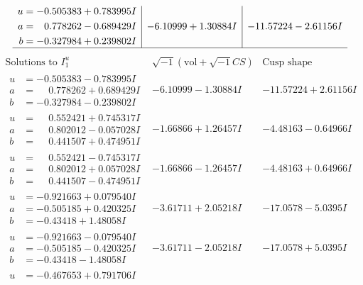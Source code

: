 \documentclass[1p]{elsarticle_modified}
\theoremstyle{definition}
\newcommand{\I}{\sqrt{-1}}
\begin{document}
$$\begin{array}{c|c|c}
\begin{aligned}
u &= -0.505383 + 0.783995 I \\
a &= \phantom{-}0.778262 - 0.689429 I \\
b &= -0.327984 + 0.239802 I\end{aligned}
 & -6.10999 + 1.30884 I & -11.57224 - 2.61156 I\\
 \hline 
 \end{array}$$\newpage$$\begin{array}{c|c|c}  
\text{Solutions to }I^u_{1}& \I (\text{vol} + \sqrt{-1}CS) & \text{Cusp shape}\\
 \hline 
\begin{aligned}
u &= -0.505383 - 0.783995 I \\
a &= \phantom{-}0.778262 + 0.689429 I \\
b &= -0.327984 - 0.239802 I\end{aligned}
 & -6.10999 - 1.30884 I & -11.57224 + 2.61156 I \\ \hline\begin{aligned}
u &= \phantom{-}0.552421 + 0.745317 I \\
a &= \phantom{-}0.802012 - 0.057028 I \\
b &= \phantom{-}0.441507 + 0.474951 I\end{aligned}
 & -1.66866 + 1.26457 I & -4.48163 - 0.64966 I \\ \hline\begin{aligned}
u &= \phantom{-}0.552421 - 0.745317 I \\
a &= \phantom{-}0.802012 + 0.057028 I \\
b &= \phantom{-}0.441507 - 0.474951 I\end{aligned}
 & -1.66866 - 1.26457 I & -4.48163 + 0.64966 I \\ \hline\begin{aligned}
u &= -0.921663 + 0.079540 I \\
a &= -0.505185 + 0.420325 I \\
b &= -0.43418 + 1.48058 I\end{aligned}
 & -3.61711 + 2.05218 I & -17.0578 - 5.0395 I \\ \hline\begin{aligned}
u &= -0.921663 - 0.079540 I \\
a &= -0.505185 - 0.420325 I \\
b &= -0.43418 - 1.48058 I\end{aligned}
 & -3.61711 - 2.05218 I & -17.0578 + 5.0395 I \\ \hline\begin{aligned}
u &= -0.467653 + 0.791706 I \\

\end{aligned}
\end{array}$$
\end{document}
